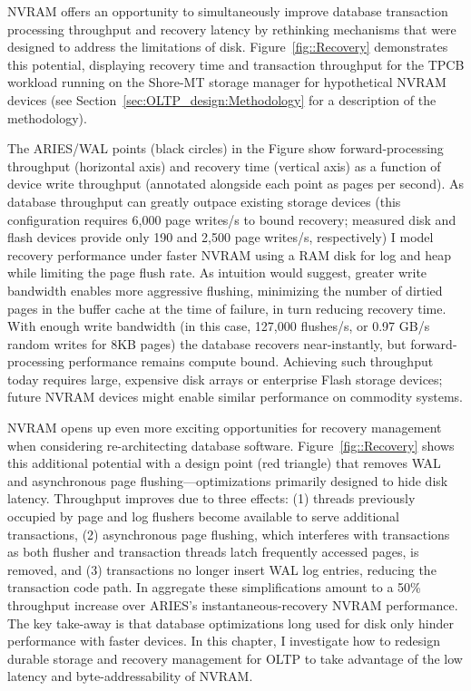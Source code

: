 NVRAM offers an opportunity to simultaneously improve database transaction processing throughput and recovery latency by rethinking mechanisms that were designed to address the limitations of disk.
Figure~\ref{fig::Recovery} demonstrates this potential, displaying recovery time and transaction throughput for the TPCB workload running on the Shore-MT storage manager \cite{JohnsonPandis09} for hypothetical NVRAM devices (see Section~\ref{sec:OLTP_design:Methodology} for a description of the methodology).



The ARIES/WAL points (black circles) in the Figure show forward-processing throughput (horizontal axis) and recovery time (vertical axis) as a function of device write throughput (annotated alongside each point as pages per second).
As database throughput can greatly outpace existing storage devices (this configuration requires 6,000 page writes/s to bound recovery; measured disk and flash devices provide only 190 and 2,500 page writes/s, respectively) I model recovery performance under faster NVRAM using a RAM disk for log and heap while limiting the page flush rate.
As intuition would suggest, greater write bandwidth enables more aggressive flushing, minimizing the number of dirtied pages in the buffer cache at the time of failure, in turn reducing recovery time.
With enough write bandwidth (in this case, 127,000 flushes/s, or 0.97 GB/s random writes for 8KB pages) the database recovers near-instantly, but forward-processing performance remains compute bound.
Achieving such throughput today requires large, expensive disk arrays or enterprise Flash storage devices; future NVRAM devices might enable similar performance on commodity systems.

NVRAM opens up even more exciting opportunities for recovery management when considering re-architecting database software.
Figure~\ref{fig::Recovery} shows this additional potential with a design point (red triangle) that removes WAL and asynchronous page flushing---optimizations primarily designed to hide disk latency.
Throughput improves due to three effects: (1) threads previously occupied by page and log flushers become available to serve additional transactions, (2) asynchronous page flushing, which interferes with transactions as both flusher and transaction threads latch frequently accessed pages, is removed, and (3) transactions no longer insert WAL log entries, reducing the transaction code path.
In aggregate these simplifications amount to a 50\% throughput increase over ARIES's instantaneous-recovery NVRAM performance.
The key take-away is that database optimizations long used for disk only hinder performance with faster devices.
In this chapter, I investigate how to redesign durable storage and recovery management for OLTP to take advantage of the low latency and byte-addressability of NVRAM.

